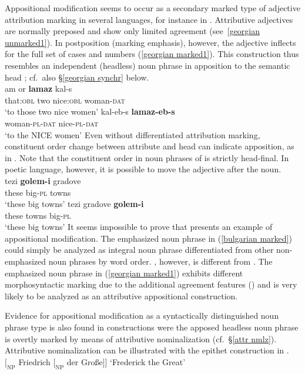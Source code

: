 Appositional modification seems to occur as a secondary marked type of adjective attribution marking in several languages, for instance in . Attributive adjectives are normally preposed and show only limited agreement (see~\ref{georgian unmarked1}). In postposition (marking emphasis), however, the adjective inflects for the full set of cases and numbers (\ref{georgian marked1}). This construction thus resembles an independent (headless) noun phrase in apposition to the semantic head \parencite[652, 677]{testelec1998}; cf.~also \S\ref{georgian synchr} below.
\ea
{}\\
\ea \label{georgian unmarked1}
\gll	am or \textbf{lamaz} kal-s\\
	that:\textsc{obl} two nice:\textsc{obl} woman-\textsc{dat}\\
\glt	‘to those two nice women’
\ex \label{georgian marked1}
\gll	kal-eb-s \textbf{lamaz-eb-s}\\
	woman-\textsc{pl}-\textsc{dat} nice-\textsc{pl}-\textsc{dat}\\
\glt	‘to the NICE women’
\z
\z
Even without differentiated attribution marking, constituent order change between attribute and head can indicate apposition, as in . Note that the constituent order in noun phrases of  is strictly head-final. In poetic language, however, it is possible to move the adjective after the noun.
\ea
{}\\
\ea
\gll	tezi \textbf{golem-i} gradove\\
	these big-\textsc{pl} towns\\
\glt	‘these big towns’
\ex	\label{bulgarian marked}
\gll	tezi gradove \textbf{golem-i}\\
	these towns big-\textsc{pl}\\
\glt	‘these big towns’
\z
\z
It seems impossible to prove that  presents an example of appositional modification. The emphasized noun phrase in (\ref{bulgarian marked}) could simply be analyzed as integral noun phrase differentiated from other non-emphasized noun phrases by word order. , however, is different from . The emphasized noun phrase in (\ref{georgian marked1}) exhibits different morphosyntactic marking due to the additional agreement features () and is very likely to be analyzed as an attributive appositional construction. 

Evidence for appositional modification as a syntactically distinguished noun phrase type is also found in constructions were the apposed headless noun phrase is overtly marked by means of attributive nominalization (cf.~\S\ref{attr nmlz}). Attributive nominalization can be illustrated with the epithet construction in .
\ea 
{}\\
$[_\textrm{NP}$ Friedrich $[_\textrm{NP}$ der Gro{ß}e$] ]$ \textrm{‘Frederick the Great’}
\z

%